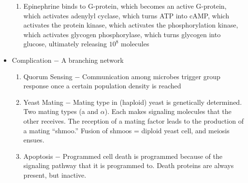 \documentclass[12pt]{article}
\begin{document}
\begin{itemize}
    \begin{enumerate}

      \item Epinephrine binds to G-protein, which becomes an active G-protein, which activates adenylyl cyclase, which turns ATP into cAMP, which activates the protein kinase, which activates the phosphorylation kinase, which activates glycogen phosphorylase, which turns glycogen into glucose, ultimately releasing $10^8$ molecules

    \end{enumerate}

  \item Complication $-$ A branching network

    \begin{enumerate}

      \item Quorum Sensing $-$ Communication among microbes trigger group response once a certain population density is reached

      \item Yeast Mating $-$ Mating type in (haploid) yeast is genetically determined. Two mating types (a and $\alpha$). Each makes signaling molecules that the other receives. The reception of a mating factor leads to the production of a mating ``shmoo.'' Fusion of shmoos = diploid yeast cell, and meiosis ensues.

      \item Apoptosis $-$ Programmed cell death is programmed because of the signaling pathway that it is programmed to. Death proteins are always present, but inactive.

    \end{enumerate}

\end{itemize}
\end{document}
